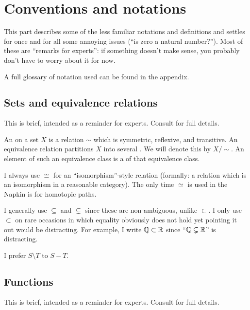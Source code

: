 \section{Conventions and notations}
This part describes some of the less familiar notations and definitions
and settles for once and for all some annoying issues (``is zero a natural number?'').
Most of these are ``remarks for experts'':
if something doesn't make sense, you probably don't have to worry about it for now.

A full glossary of notation used can be found in the appendix.

\subsection*{Sets and equivalence relations}
This is brief, intended as a reminder for experts.
Consult  for full details.

An  on a set $X$ is a relation $\sim$
which is symmetric, reflexive, and transitive.
An equivalence relation partitions $X$ into several .
We will denote this by $X / {\sim}$.
An element of such an equivalence class is a  of that equivalence class.

I always use $\cong$ for an ``isomorphism''-style relation
(formally: a relation which is an isomorphism in a reasonable category).
The only time $\simeq$ is used in the Napkin is for homotopic paths.

I generally use $\subseteq$ and $\subsetneq$ since these are non-ambiguous,
unlike $\subset$.  I only use $\subset$ on rare occasions in which equality
obviously does not hold yet pointing it out would be distracting.
For example, I write $\mathbb Q \subset \mathbb R$
since ``$\mathbb Q \subsetneq \mathbb R$'' is distracting.

I prefer $S \setminus T$ to $S - T$.

\subsection*{Functions}
This is brief, intended as a reminder for experts.
Consult  for full details.

